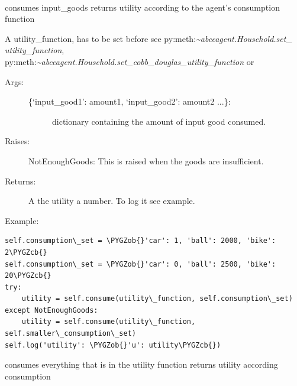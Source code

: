 \documentclass[letterpaper,10pt,english]{sphinxmanual}
\def\PYGZob{\char`\{}
\def\PYGZcb{\char`\}}
\begin{document}
\begin{fulllineitems}
\label{Household:abce.Household}~

\begin{fulllineitems}
\label{Household:abce.Household.consume}
consumes input\_goods returns utility according to the agent's
consumption function

A utility\_function, has to be set before see
py:meth:\emph{\textasciitilde{}abceagent.Household.set\_   utility\_function},
py:meth:\emph{\textasciitilde{}abceagent.Household.set\_cobb\_douglas\_utility\_function} or
\begin{description}
\item[{Args:}] \leavevmode\begin{description}
\item[{\{`input\_good1': amount1, `input\_good2': amount2 ...\}:}] \leavevmode
dictionary containing the amount of input good consumed.

\end{description}

\item[{Raises:}] \leavevmode
NotEnoughGoods: This is raised when the goods are insufficient.

\item[{Returns:}] \leavevmode
A the utility a number. To log it see example.

\end{description}

Example:

\begin{Verbatim}[commandchars=\\\{\}]
self.consumption\_set = \PYGZob{}'car': 1, 'ball': 2000, 'bike':  2\PYGZcb{}
self.consumption\_set = \PYGZob{}'car': 0, 'ball': 2500, 'bike':  20\PYGZcb{}
try:
    utility = self.consume(utility\_function, self.consumption\_set)
except NotEnoughGoods:
    utility = self.consume(utility\_function, self.smaller\_consumption\_set)
self.log('utility': \PYGZob{}'u': utility\PYGZcb{})
\end{Verbatim}

\end{fulllineitems}


\begin{fulllineitems}
\label{Household:abce.Household.consume_everything}
consumes everything that is in the utility function
returns utility according consumption


\end{fulllineitems}
\end{fulllineitems}
\end{document}
